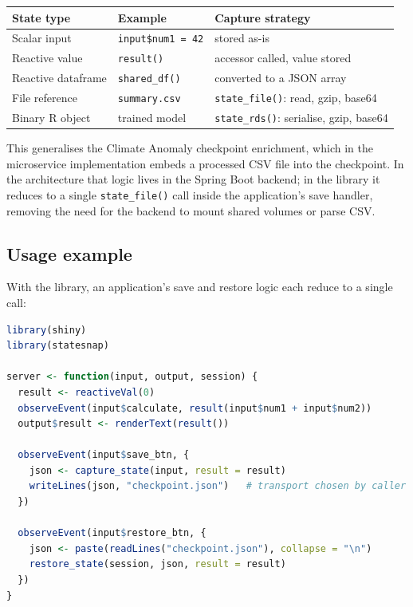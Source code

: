 \documentclass[11pt,a4paper]{article}
\begin{document}
\begin{center}
\begin{tabular}{lll}
\toprule
\textbf{State type} & \textbf{Example} & \textbf{Capture strategy} \\
\midrule
Scalar input        & \texttt{input\$num1 = 42}    & stored as-is \\
Reactive value      & \texttt{result()}             & accessor called, value stored \\
Reactive dataframe  & \texttt{shared\_df()}         & converted to a JSON array \\
File reference       & \texttt{summary.csv}          & \texttt{state\_file()}: read, gzip, base64 \\
Binary R object      & trained model                 & \texttt{state\_rds()}: serialise, gzip, base64 \\
\bottomrule
\end{tabular}
\end{center}

This generalises the Climate Anomaly checkpoint enrichment, which in the
microservice implementation embeds a processed CSV file into the checkpoint. In
the architecture that logic lives in the Spring Boot backend; in the library it
reduces to a single \texttt{state\_file()} call inside the application's save
handler, removing the need for the backend to mount shared volumes or parse CSV.

\subsection{Usage example}

With the library, an application's save and restore logic each reduce to a single
call:

\begin{lstlisting}[language=R]
library(shiny)
library(statesnap)

server <- function(input, output, session) {
  result <- reactiveVal(0)
  observeEvent(input$calculate, result(input$num1 + input$num2))
  output$result <- renderText(result())

  observeEvent(input$save_btn, {
    json <- capture_state(input, result = result)
    writeLines(json, "checkpoint.json")   # transport chosen by caller
  })

  observeEvent(input$restore_btn, {
    json <- paste(readLines("checkpoint.json"), collapse = "\n")
    restore_state(session, json, result = result)
  })
}
\end{lstlisting}
\end{document}
